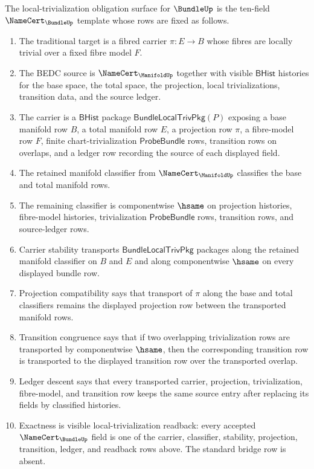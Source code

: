 \begin{definition}
\label{def:bundle-local-trivialization-obligation-surface}
The local-trivialization obligation surface for $\BundleUp$ is the ten-field
$\NameCert_{\BundleUp}$ template whose rows are fixed as follows.
\begin{enumerate}
\item The traditional target is a fibred carrier $\pi:E\to B$ whose fibres are
locally trivial over a fixed fibre model $F$.
\item The BEDC source is $\NameCert_{\ManifoldUp}$ together with visible
$\mathsf{BHist}$ histories for the base space, the total space, the projection,
local trivializations, transition data, and the source ledger.
\item The carrier is a $\mathsf{BHist}$ package
$\mathsf{BundleLocalTrivPkg}(P)$ exposing a base manifold row $B$, a total
manifold row $E$, a projection row $\pi$, a fibre-model row $F$, finite
chart-trivialization $\mathsf{ProbeBundle}$ rows, transition rows on overlaps,
and a ledger row recording the source of each displayed field.
\item The retained manifold classifier from $\NameCert_{\ManifoldUp}$ classifies
the base and total manifold rows.
\item The remaining classifier is componentwise $\hsame$ on projection
histories, fibre-model histories, trivialization $\mathsf{ProbeBundle}$ rows,
transition rows, and source-ledger rows.
\item Carrier stability transports $\mathsf{BundleLocalTrivPkg}$ packages along
the retained manifold classifier on $B$ and $E$ and along componentwise
$\hsame$ on every displayed bundle row.
\item Projection compatibility says that transport of $\pi$ along the base and
total classifiers remains the displayed projection row between the transported
manifold rows.
\item Transition congruence says that if two overlapping trivialization rows
are transported by componentwise $\hsame$, then the corresponding transition
row is transported to the displayed transition row over the transported
overlap.
\item Ledger descent says that every transported carrier, projection,
trivialization, fibre-model, and transition row keeps the same source entry
after replacing its fields by classified histories.
\item Exactness is visible local-trivialization readback: every accepted
$\NameCert_{\BundleUp}$ field is one of the carrier, classifier, stability,
projection, transition, ledger, and readback rows above. The standard bridge
row is absent.
\end{enumerate}
\end{definition}

